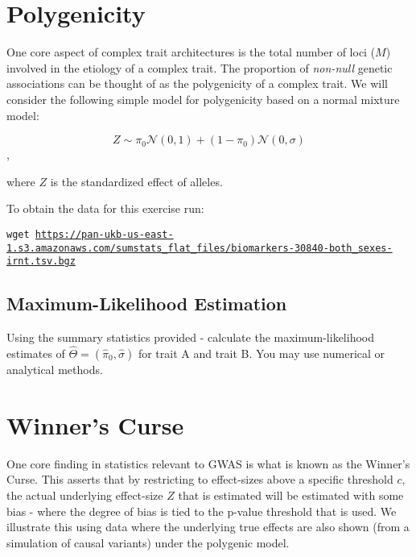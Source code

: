 \documentclass{pset}
\date{6/1/2025}
\begin{document}
\maketitle

\section{Polygenicity}

One core aspect of complex trait architectures is the total number of loci ($M$) involved in the etiology of a complex trait. The proportion of \textit{non-null} genetic associations can be thought of as the polygenicity of a complex trait. We will consider the following simple model for polygenicity based on a normal mixture model:  

$$Z \sim \pi_0 \mathcal{N}(0,1) + (1 - \pi_0)\mathcal{N}(0,\sigma)$$,

where $Z$ is the standardized effect of alleles.

To obtain the data for this exercise run: 

\begin{center}
\texttt{wget \url{https://pan-ukb-us-east-1.s3.amazonaws.com/sumstats_flat_files/biomarkers-30840-both_sexes-irnt.tsv.bgz}}
\end{center}


\subsection*{Maximum-Likelihood Estimation}

Using the summary statistics provided - calculate the maximum-likelihood estimates of $\hat{\Theta} = (\hat{\pi}_0, \hat{\sigma})$ for trait A and trait B. You may use numerical or analytical methods. 


\section{Winner's Curse}

One core finding in statistics relevant to GWAS is what is known as the Winner's Curse. This asserts that by restricting to effect-sizes above a specific threshold $c$, the actual underlying effect-size $\hat{Z}$ that is estimated will be estimated with some bias - where the degree of bias is tied to the p-value threshold that is used. We illustrate this using data where the underlying true effects are also shown (from a simulation of causal variants) under the polygenic model. 
\end{document}
